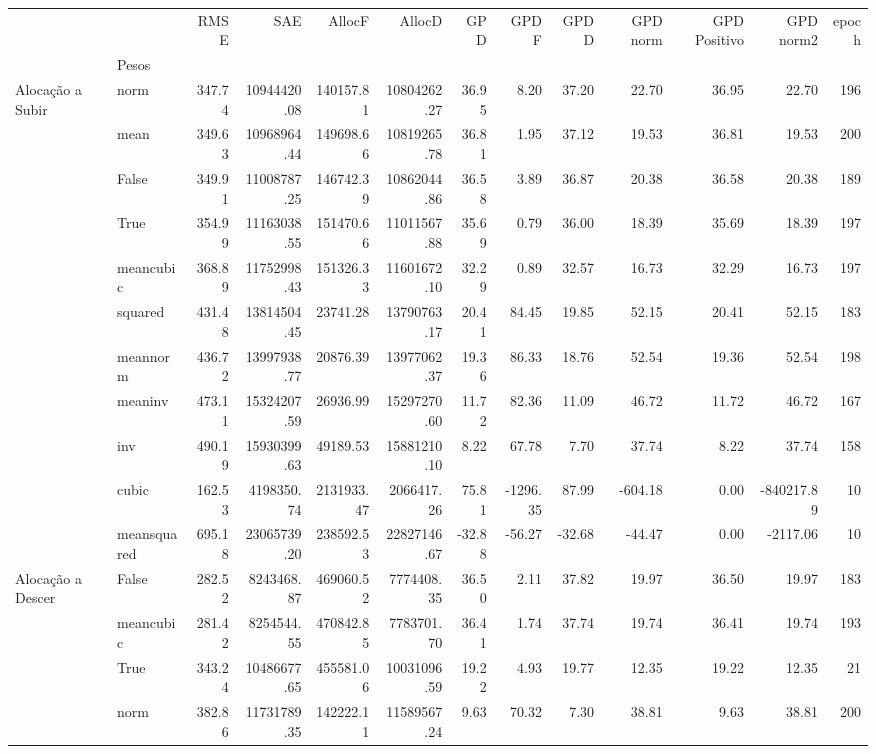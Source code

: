 \begin{tabular}{llrrrrrrrrrrr}
\toprule
 &  & RMSE & SAE & AllocF & AllocD & GPD & GPD F & GPD D & GPD norm & GPD Positivo & GPD norm2 & epoch \\
 & Pesos &  &  &  &  &  &  &  &  &  &  &  \\
\midrule
\multirow[t]{11}{*}{Alocação a Subir} & norm & 347.74 & 10944420.08 & 140157.81 & 10804262.27 & 36.95 & 8.20 & 37.20 & 22.70 & 36.95 & 22.70 & 196 \\
 & mean & 349.63 & 10968964.44 & 149698.66 & 10819265.78 & 36.81 & 1.95 & 37.12 & 19.53 & 36.81 & 19.53 & 200 \\
 & False & 349.91 & 11008787.25 & 146742.39 & 10862044.86 & 36.58 & 3.89 & 36.87 & 20.38 & 36.58 & 20.38 & 189 \\
 & True & 354.99 & 11163038.55 & 151470.66 & 11011567.88 & 35.69 & 0.79 & 36.00 & 18.39 & 35.69 & 18.39 & 197 \\
 & meancubic & 368.89 & 11752998.43 & 151326.33 & 11601672.10 & 32.29 & 0.89 & 32.57 & 16.73 & 32.29 & 16.73 & 197 \\
 & squared & 431.48 & 13814504.45 & 23741.28 & 13790763.17 & 20.41 & 84.45 & 19.85 & 52.15 & 20.41 & 52.15 & 183 \\
 & meannorm & 436.72 & 13997938.77 & 20876.39 & 13977062.37 & 19.36 & 86.33 & 18.76 & 52.54 & 19.36 & 52.54 & 198 \\
 & meaninv & 473.11 & 15324207.59 & 26936.99 & 15297270.60 & 11.72 & 82.36 & 11.09 & 46.72 & 11.72 & 46.72 & 167 \\
 & inv & 490.19 & 15930399.63 & 49189.53 & 15881210.10 & 8.22 & 67.78 & 7.70 & 37.74 & 8.22 & 37.74 & 158 \\
 & cubic & 162.53 & 4198350.74 & 2131933.47 & 2066417.26 & 75.81 & -1296.35 & 87.99 & -604.18 & 0.00 & -840217.89 & 10 \\
 & meansquared & 695.18 & 23065739.20 & 238592.53 & 22827146.67 & -32.88 & -56.27 & -32.68 & -44.47 & 0.00 & -2117.06 & 10 \\
\cline{1-13}
\multirow[t]{12}{*}{Alocação a Descer} & False & 282.52 & 8243468.87 & 469060.52 & 7774408.35 & 36.50 & 2.11 & 37.82 & 19.97 & 36.50 & 19.97 & 183 \\
 & meancubic & 281.42 & 8254544.55 & 470842.85 & 7783701.70 & 36.41 & 1.74 & 37.74 & 19.74 & 36.41 & 19.74 & 193 \\
 & True & 343.24 & 10486677.65 & 455581.06 & 10031096.59 & 19.22 & 4.93 & 19.77 & 12.35 & 19.22 & 12.35 & 21 \\
 & norm & 382.86 & 11731789.35 & 142222.11 & 11589567.24 & 9.63 & 70.32 & 7.30 & 38.81 & 9.63 & 38.81 & 200 \\

\end{tabular}
